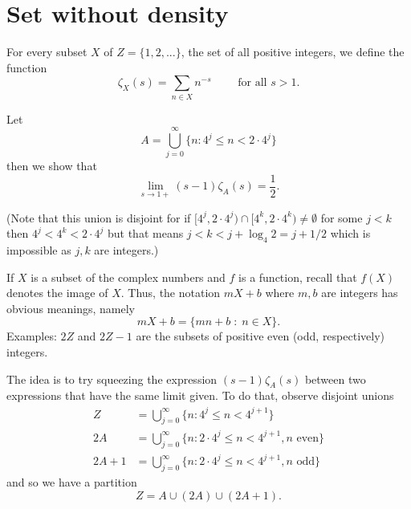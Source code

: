 \documentclass{article}
\begin{document}
\section{Set without density}

For every subset $X$ of $Z = \{1, 2, ...\}$, the set of all positive integers, we define the function
$$\zeta_X(s) = \sum_{n \in X} n^{-s} \qquad \text{ for all } s > 1.$$

Let
$$A = \bigcup_{j = 0}^{\infty} \{n : 4^j \leq n < 2 \cdot 4^j\}$$
then we show that
$$\lim_{s \rightarrow 1+} (s - 1) \zeta_A(s) = \frac{1}{2}.$$

(Note that this union is disjoint for if $[4^j, 2\cdot 4^j) \cap [4^k, 2 \cdot 4^k) \not= \emptyset$ for some $j < k$ then $4^j < 4^k < 2 \cdot 4^j$ but that means $j < k < j + \log_4 2 = j + 1/2$ which is impossible as $j, k$ are integers.)

If $X$ is a subset of the complex numbers and $f$ is a function, recall that $f(X)$ denotes the image of $X$.
Thus, the notation $mX + b$ where $m, b$ are integers has obvious meanings, namely
$$m X + b = \{mn + b \;:\; n \in X\}.$$
Examples: $2Z$ and $2Z - 1$ are the subsets of positive even (odd, respectively) integers.

The idea is to try squeezing the expression $(s - 1) \zeta_A(s)$ between two expressions that have the same limit given.
To do that, observe disjoint unions
\begin{align*}
Z &= \bigcup_{j = 0}^{\infty} \{n : 4^j \leq n < 4^{j+1}\}\\
2A &= \bigcup_{j = 0}^{\infty} \{n : 2 \cdot 4^j \leq n < 4^{j+1}, n \text{ even}\}\\
2A + 1 &= \bigcup_{j = 0}^{\infty} \{n : 2 \cdot 4^j \leq n < 4^{j+1}, n \text{ odd}\}
\end{align*}
and so we have a partition
$$Z = A \cup (2A) \cup (2A + 1).$$
\end{document}
